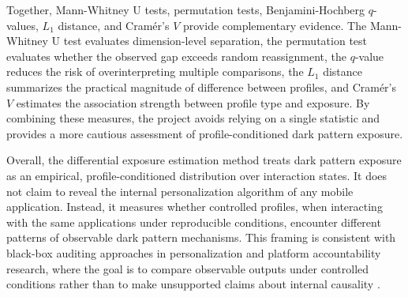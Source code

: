 Together, Mann-Whitney U tests, permutation tests, Benjamini-Hochberg \(q\)-values, \(L_1\) distance, and Cramér's \(V\) provide complementary evidence. The Mann-Whitney U test evaluates dimension-level separation, the permutation test evaluates whether the observed gap exceeds random reassignment, the \(q\)-value reduces the risk of overinterpreting multiple comparisons, the \(L_1\) distance summarizes the practical magnitude of difference between profiles, and Cramér's \(V\) estimates the association strength between profile type and exposure. By combining these measures, the project avoids relying on a single statistic and provides a more cautious assessment of profile-conditioned dark pattern exposure.

Overall, the differential exposure estimation method treats dark pattern exposure as an empirical, profile-conditioned distribution over interaction states. It does not claim to reveal the internal personalization algorithm of any mobile application. Instead, it measures whether controlled profiles, when interacting with the same applications under reproducible conditions, encounter different patterns of observable dark pattern mechanisms. This framing is consistent with black-box auditing approaches in personalization and platform accountability research, where the goal is to compare observable outputs under controlled conditions rather than to make unsupported claims about internal causality \cite{sandvig2014auditing,hannak2013personalization,srba2023youtube}.
